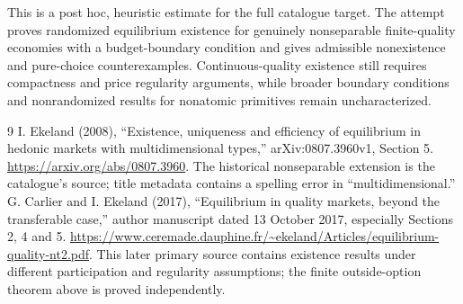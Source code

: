 \documentclass[11pt,a4paper]{article}
\theoremstyle{definition}
\theoremstyle{remark}
\begin{document}
This is a post hoc, heuristic estimate for the full catalogue target.
The attempt proves randomized equilibrium existence for genuinely nonseparable finite-quality economies with a budget-boundary condition and gives admissible nonexistence and pure-choice counterexamples. Continuous-quality existence still requires compactness and price regularity arguments, while broader boundary conditions and nonrandomized results for nonatomic primitives remain uncharacterized.

\begin{thebibliography}{9}
 I. Ekeland (2008), ``Existence, uniqueness and efficiency of equilibrium in hedonic markets with multidimensional types,'' arXiv:0807.3960v1, Section 5. \url{https://arxiv.org/abs/0807.3960}. The historical nonseparable extension is the catalogue's source; title metadata contains a spelling error in ``multidimensional.''
 G. Carlier and I. Ekeland (2017), ``Equilibrium in quality markets, beyond the transferable case,'' author manuscript dated 13 October 2017, especially Sections 2, 4 and 5. \url{https://www.ceremade.dauphine.fr/~ekeland/Articles/equilibrium-quality-nt2.pdf}. This later primary source contains existence results under different participation and regularity assumptions; the finite outside-option theorem above is proved independently.
\end{thebibliography}
\end{document}
